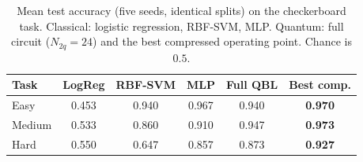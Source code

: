 \documentclass[conference]{IEEEtran}
\begin{document}
\begin{table}[H]
\centering
\caption{Mean test accuracy (five seeds, identical splits) on the checkerboard task.
Classical: logistic regression, RBF-SVM, MLP. Quantum: full circuit ($N_{2q}=24$) and the
best compressed operating point. Chance is $0.5$.}
\label{tab:classical}
\begin{tabular}{lccccc}
\toprule
Task & LogReg & RBF-SVM & MLP & Full QBL & Best comp. \\
\midrule
Easy   & 0.453 & 0.940 & 0.967 & 0.940 & \textbf{0.970} \\
Medium & 0.533 & 0.860 & 0.910 & 0.947 & \textbf{0.973} \\
Hard   & 0.550 & 0.647 & 0.857 & 0.873 & \textbf{0.927} \\
\bottomrule
\end{tabular}
\end{table}
\end{document}
